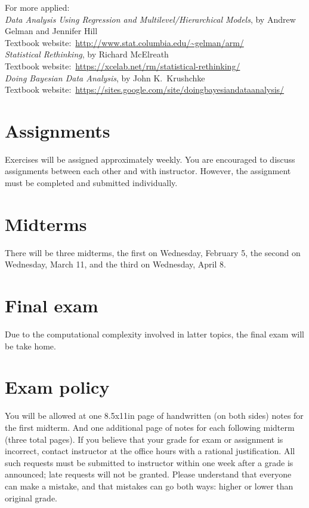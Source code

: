 \documentclass[11pt,onecolumn]{article}
\begin{document}
For more applied:\\
\emph{Data Analysis Using Regression and Multilevel/Hierarchical Models}, by Andrew Gelman and Jennifer Hill\\
Textbook website:~\url{http://www.stat.columbia.edu/~gelman/arm/}\\
\emph{Statistical Rethinking}, by Richard McElreath\\
Textbook website:~\url{https://xcelab.net/rm/statistical-rethinking/}\\
\emph{Doing Bayesian Data Analysis}, by John K.~Krushchke\\
Textbook website:~\url{https://sites.google.com/site/doingbayesiandataanalysis/}\\


\section*{Assignments}
Exercises will be assigned approximately weekly. You are encouraged to discuss assignments between each other and with instructor. However, the assignment must be completed and submitted individually. 

\section*{Midterms}
There will be three midterms, the first on Wednesday, February 5, the second on Wednesday, March 11, and the third on Wednesday, April 8.

\section*{Final exam}
Due to the computational complexity involved in latter topics, the final exam will be take home.

\section*{Exam policy} You will be allowed at one 8.5x11in page of handwritten (on both sides) notes for the first midterm. And one additional page of notes for each following midterm (three total pages). If you believe that your grade for exam or assignment is incorrect, contact instructor at the office hours with a rational justification. All such requests must be submitted to instructor within one week after a grade is announced; late requests will not be granted. Please understand that everyone can make a mistake, and that mistakes can go both ways: higher or lower than original grade.
\end{document}
